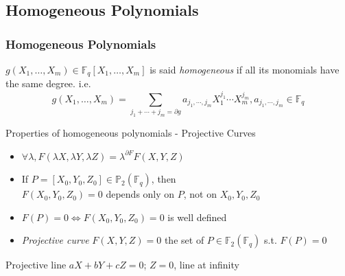 \documentclass[10pt]{beamer} %
\newcommand{\F}{\mathbb F}
\theoremstyle{definition}
\begin{document}
\subsection{Homogeneous Polynomials}
\begin{frame}
\frametitle{Homogeneous Polynomials}

\begin{Definition}
$g(X_1,\ldots,X_m)\in\F_q[X_1,\ldots,X_m]$ is said \emph{homogeneous}
if all its monomials have the same degree. {i.e.
$$g(X_1,\ldots,X_m)=\sum_{j_1+\cdots+j_m=\partial g}a_{j_1,\cdots,j_m}X_1^{j_1}\cdots X_m^{j_m}, a_{j_1,\cdots,j_m}\in\F_q$$}\vspace*{-2.4pt}
\end{Definition}\pause

\begin{beamerboxesrounded}[upper=block title,lower=block example,shadow=true]{Properties of homogeneous polynomials - Projective Curves}
\begin{itemize}[<+-| alert@+>]
 \item $\forall\lambda, F(\lambda X,\lambda Y,\lambda Z)=\lambda^{\partial F}F(X,Y,Z)$
 \item If $P=[X_0,Y_0,Z_0]\in\mathbb P_2(\F_q)$, then\\
$F(X_0,Y_0,Z_0)=0$ depends only on $P$, not on $X_0,Y_0,Z_0$
 \item $F(P)=0 \Leftrightarrow F(X_0,Y_0,Z_0)=0$ is well defined
 \item \emph{Projective curve} $F(X,Y,Z)=0$ the set of $P\in\mathbb F_2(\F_q)$ s.t. $F(P)=0$
\end{itemize}\pause
\end{beamerboxesrounded}

\begin{example}
 Projective line $aX+bY+cZ=0$;  $Z=0$, line at infinity
\end{example}
\end{frame}
\end{document}
